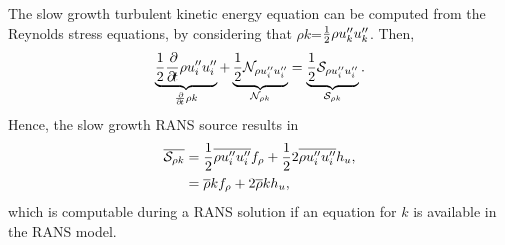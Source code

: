 {The slow growth turbulent kinetic energy equation can be
computed from the Reynolds stress equations, by considering that
$\rho k$=$\frac{1}{2} \rho u_k'' u_k''$. Then,
%
\begin{equation}
\begin{split}
  \underbrace{\frac{1}{2} \frac{\partial\!{}}{\partial\!{t}}\rho u_i'' u_i''    }_{\frac{\partial\!{}}{\partial\!{t}}\rho k}
+ \underbrace{\frac{1}{2} \mathcal{N}_{\rho u_i''u_i''} }_{\mathcal{N}_{\rho k}}
= \underbrace{\frac{1}{2} \mathcal{S}_{\rho u_i'' u_i''}       }_{\mathcal{S}_{\rho k}}
.
\end{split}
\end{equation}
%
%
Hence, the slow growth RANS source results in
%
\begin{align}
\label{eqn:source_tke}
\overline{\mathcal{S}_{\rho k}}
&= \frac{1}{2} \overline{\rho u_i'' u_i''} f_{\rho}
+  \frac{1}{2} 2 \overline{\rho u_i'' u_i''} h_{u}, \notag \\
&= \overline{\rho} k f_{\rho} + 2 \overline{\rho} k h_{u},
\end{align}
%
which is computable during a RANS solution if an equation for $k$ is available
in the RANS model.
%

}
